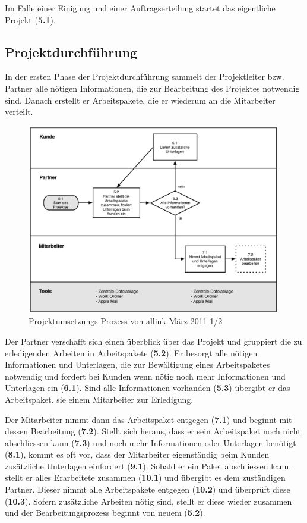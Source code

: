 Im Falle einer Einigung und einer Auftragserteilung startet das eigentliche
Projekt (\textbf{5.1}).

\clearpage

\subsection{Projektdurchführung}
In der ersten Phase der Projektdurchführung sammelt der Projektleiter bzw.
Partner alle nötigen Informationen, die zur Bearbeitung des Projektes notwendig sind.
Danach erstellt er Arbeitspakete, die er wiederum an die Mitarbeiter verteilt.

\begin{figure}[htbp]
\begin{center}
\includegraphics[width=0.99\textwidth,angle=0]{./bilder/02_ist_prozesse_arbeit_01.pdf}
\caption{Projektumsetzungs Prozess von allink März 2011 1/2}
\label{pic:02_ist_prozesse_arbeit_01}
\end{center}
\end{figure}

Der Partner verschafft sich einen überblick über das Projekt und gruppiert
die zu erledigenden Arbeiten in Arbeitspakete (\textbf{5.2}). Er besorgt alle nötigen Informationen
und Unterlagen, die zur Bewältigung eines Arbeitspaketes notwendig und fordert
bei Kunden wenn nötig noch mehr Informationen und Unterlagen ein (\textbf{6.1}).
Sind alle Informationen vorhanden (\textbf{5.3}) übergibt er das Arbeitspaket.
sie einem Mitarbeiter zur Erledigung.

Der Mitarbeiter nimmt dann das Arbeitspaket entgegen (\textbf{7.1}) und beginnt
mit dessen Bearbeitung (\textbf{7.2}). Stellt sich heraus, dass er sein Arbeitspaket
noch nicht abschliessen kann (\textbf{7.3}) und noch mehr Informationen oder
Unterlagen benötigt (\textbf{8.1}), kommt es oft vor, dass der Mitarbeiter
eigenständig beim Kunden zusätzliche Unterlagen einfordert (\textbf{9.1}).
Sobald er ein Paket abschliessen kann, stellt er alles Erarbeitete zusammen (\textbf{10.1})
und übergibt es dem zuständigen Partner.
Dieser nimmt alle Arbeitspakete entgegen (\textbf{10.2})
und überprüft diese (\textbf{10.3}). Sofern zusätzliche Arbeiten nötig sind,
stellt er diese wieder zusammen und der Bearbeitungsprozess beginnt von neuem (\textbf{5.2}).

